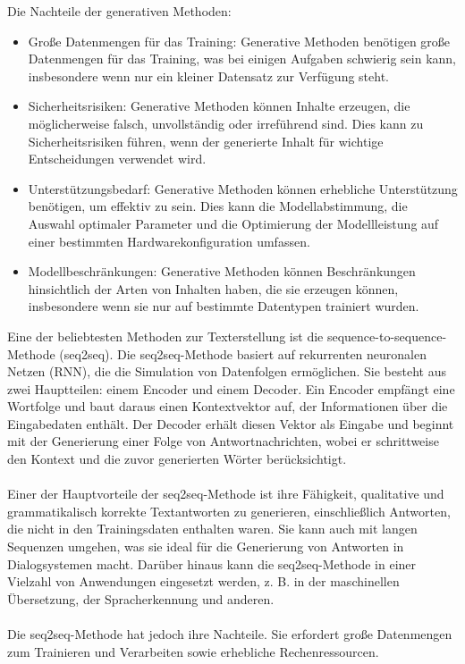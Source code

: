 Die Nachteile der generativen Methoden:
\begin{itemize}
    \item Große Datenmengen für das Training: Generative Methoden benötigen große Datenmengen für das Training, was bei einigen Aufgaben schwierig sein kann, insbesondere wenn nur ein kleiner Datensatz zur Verfügung steht.
    \item Sicherheitsrisiken: Generative Methoden können Inhalte erzeugen, die möglicherweise falsch, unvollständig oder irreführend sind. Dies kann zu Sicherheitsrisiken führen, wenn der generierte Inhalt für wichtige Entscheidungen verwendet wird.
    \item Unterstützungsbedarf: Generative Methoden können erhebliche Unterstützung benötigen, um effektiv zu sein. Dies kann die Modellabstimmung, die Auswahl optimaler Parameter und die Optimierung der Modellleistung auf einer bestimmten Hardwarekonfiguration umfassen.
    \item Modellbeschränkungen: Generative Methoden können Beschränkungen hinsichtlich der Arten von Inhalten haben, die sie erzeugen können, insbesondere wenn sie nur auf bestimmte Datentypen trainiert wurden.
\end{itemize}
Eine der beliebtesten Methoden zur Texterstellung ist die sequence-to-sequence-Methode (seq2seq). 
Die seq2seq-Methode basiert auf rekurrenten neuronalen Netzen (RNN), die die Simulation von Datenfolgen ermöglichen. 
Sie besteht aus zwei Hauptteilen: einem Encoder und einem Decoder. 
Ein Encoder empfängt eine Wortfolge und baut daraus einen Kontextvektor auf, der Informationen über die Eingabedaten enthält. 
Der Decoder erhält diesen Vektor als Eingabe und beginnt mit der Generierung einer Folge von Antwortnachrichten, wobei er schrittweise den Kontext und die zuvor generierten Wörter berücksichtigt.\\\\
Einer der Hauptvorteile der seq2seq-Methode ist ihre Fähigkeit, qualitative und grammatikalisch korrekte Textantworten zu generieren, einschließlich Antworten, die nicht in den Trainingsdaten enthalten waren. 
Sie kann auch mit langen Sequenzen umgehen, was sie ideal für die Generierung von Antworten in Dialogsystemen macht. 
Darüber hinaus kann die seq2seq-Methode in einer Vielzahl von Anwendungen eingesetzt werden, z. B. in der maschinellen Übersetzung, der Spracherkennung und anderen.\\\\
Die seq2seq-Methode hat jedoch ihre Nachteile. 
Sie erfordert große Datenmengen zum Trainieren und Verarbeiten sowie erhebliche Rechenressourcen. 
